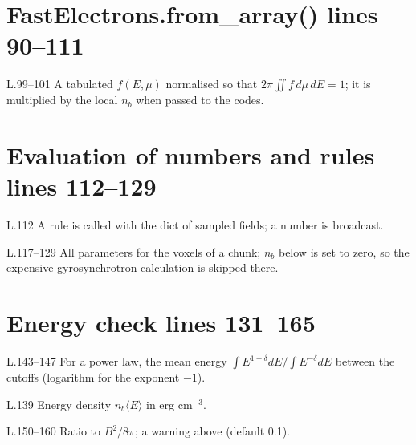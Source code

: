 \section*{\normalsize FastElectrons.from\_array() \hfill{\small\mdseries\color{gray}lines 90--111}}

\begin{lines}
\item[L.99–101] A tabulated $f(E,\mu)$ normalised so that $2\pi\iint f\,d\mu\,dE=1$; it is multiplied by the local $n_b$ when passed to the codes.
\end{lines}
\section*{\normalsize Evaluation of numbers and rules \hfill{\small\mdseries\color{gray}lines 112--129}}

\begin{lines}
\item[L.112] A rule is called with the dict of sampled fields; a number is broadcast.
\item[L.117–129] All parameters for the voxels of a chunk; $n_b$ below  is set to zero, so the expensive gyrosynchrotron calculation is skipped there.
\end{lines}
\section*{\normalsize Energy check \hfill{\small\mdseries\color{gray}lines 131--165}}

\begin{lines}
\item[L.143–147] For a power law, the mean energy $\int E^{1-\delta}dE/\int E^{-\delta}dE$ between the cutoffs (logarithm for the exponent $-1$).
\item[L.139] Energy density $n_b\langle E\rangle$ in erg cm$^{-3}$.
\item[L.150–160] Ratio to $B^2/8\pi$; a warning above  (default 0.1).
\end{lines}

